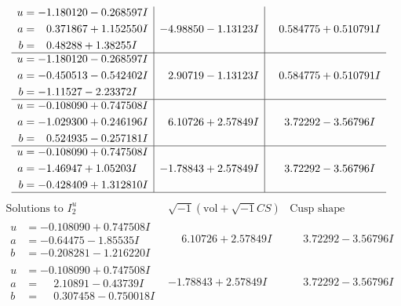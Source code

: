 \documentclass[1p]{elsarticle_modified}
\theoremstyle{definition}
\newcommand{\I}{\sqrt{-1}}
\begin{document}
$$\begin{array}{c|c|c}
\begin{aligned}
u &= -1.180120 - 0.268597 I \\
a &= \phantom{-}0.371867 + 1.152550 I \\
b &= \phantom{-}0.48288 + 1.38255 I\end{aligned}
 & -4.98850 - 1.13123 I & \phantom{-}0.584775 + 0.510791 I \\ \hline\begin{aligned}
u &= -1.180120 - 0.268597 I \\
a &= -0.450513 - 0.542402 I \\
b &= -1.11527 - 2.23372 I\end{aligned}
 & \phantom{-}2.90719 - 1.13123 I & \phantom{-}0.584775 + 0.510791 I \\ \hline\begin{aligned}
u &= -0.108090 + 0.747508 I \\
a &= -1.029300 + 0.246196 I \\
b &= \phantom{-}0.524935 - 0.257181 I\end{aligned}
 & \phantom{-}6.10726 + 2.57849 I & \phantom{-}3.72292 - 3.56796 I \\ \hline\begin{aligned}
u &= -0.108090 + 0.747508 I \\
a &= -1.46947 + 1.05203 I \\
b &= -0.428409 + 1.312810 I\end{aligned}
 & -1.78843 + 2.57849 I & \phantom{-}3.72292 - 3.56796 I\\
 \hline 
 \end{array}$$\newpage$$\begin{array}{c|c|c}  
\text{Solutions to }I^u_{2}& \I (\text{vol} + \sqrt{-1}CS) & \text{Cusp shape}\\
 \hline 
\begin{aligned}
u &= -0.108090 + 0.747508 I \\
a &= -0.64475 - 1.85535 I \\
b &= -0.208281 - 1.216220 I\end{aligned}
 & \phantom{-}6.10726 + 2.57849 I & \phantom{-}3.72292 - 3.56796 I \\ \hline\begin{aligned}
u &= -0.108090 + 0.747508 I \\
a &= \phantom{-}2.10891 - 0.43739 I \\
b &= \phantom{-}0.307458 - 0.750018 I\end{aligned}
 & -1.78843 + 2.57849 I & \phantom{-}3.72292 - 3.56796 I \\ \hline\begin{aligned}

\end{aligned}
\end{array}$$
\end{document}
